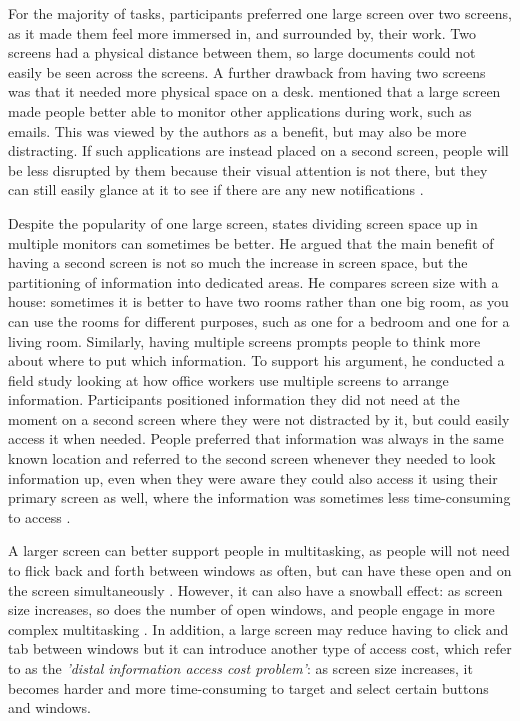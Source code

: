 For the majority of tasks, participants preferred one large screen over two screens, as it made them feel more immersed in, and surrounded by, their work. Two screens had a physical distance between them, so large documents could not easily be seen across the screens. A further drawback from having two screens was that it needed more physical space on a desk. \citet{Bi2009}  mentioned that a large screen made people better able to monitor other applications during work, such as emails. This was viewed by the authors as a benefit, but may also be more distracting. If such applications are instead placed on a second screen, people will be less disrupted by them because their visual attention is not there, but they can still easily glance at it to see if there are any new notifications \citep{Grudin2001}.  

Despite the popularity of one large screen, \citet{Grudin2001} states dividing screen space up in multiple monitors can sometimes be better. He argued that the main benefit of having a second screen is not so much the increase in screen space, but the partitioning of information into dedicated areas. He compares screen size with a house: sometimes it is better to have two rooms rather than one big room, as you can use the rooms for different purposes, such as one for a bedroom and one for a living room. Similarly, having multiple screens prompts people to think more about where to put which information. To support his argument, he conducted a field study looking at how office workers use multiple screens to arrange information. Participants positioned information they did not need at the moment on a second screen where they were not distracted by it, but could easily access it when needed. People preferred that information was always in the same known location and referred to the second screen whenever they needed to look information up, even when they were aware they could also access it using their primary screen as well, where the information was sometimes less time-consuming to access \citep{Grudin2001}. 

A larger screen can better support people in multitasking, as people will not need to flick back and forth between windows as often, but can have these open and on the screen simultaneously \citep{Czerwinski2003}. However, it can also have a snowball effect: as screen size increases, so does the number of open windows, and people engage in more complex multitasking \citep{Robertson2005}. In addition, a large screen may reduce having to click and tab between windows but it can introduce another type of access cost, which \citet{Robertson2005} refer to as the \textit{'distal information access cost problem'}: as screen size increases, it becomes harder and more time-consuming to target and select certain buttons and windows. 

